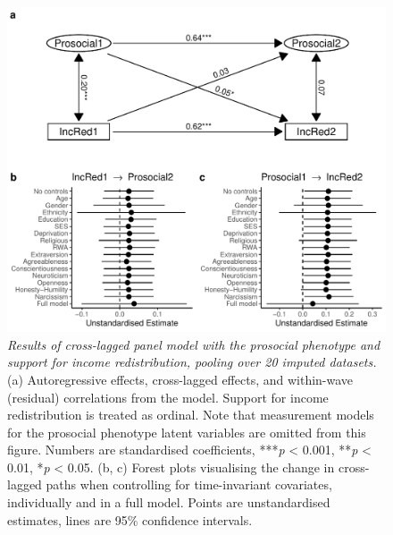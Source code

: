 \documentclass[
  man,floatsintext]{apa6}
\begin{document}
\begin{figure}
\centering
\includegraphics{manuscript_files/figure-latex/clpmPlotIncReddMReduced-1.pdf}
\caption{\label{fig:clpmPlotIncReddMReduced}\emph{Results of cross-lagged panel model with
the prosocial phenotype and support for income redistribution, pooling over 20
imputed datasets.} (a) Autoregressive effects, cross-lagged effects, and
within-wave (residual) correlations from the model. Support for income
redistribution is treated as ordinal. Note that measurement models for the
prosocial phenotype latent variables are omitted from this figure. Numbers are
standardised coefficients, ***\emph{p} \textless{} 0.001, **\emph{p} \textless{} 0.01, *\emph{p} \textless{} 0.05.
(b, c) Forest plots visualising the change in cross-lagged paths when
controlling for time-invariant covariates, individually and in a full model.
Points are unstandardised estimates, lines are 95\% confidence intervals.}
\end{figure}

\newpage
\end{document}
